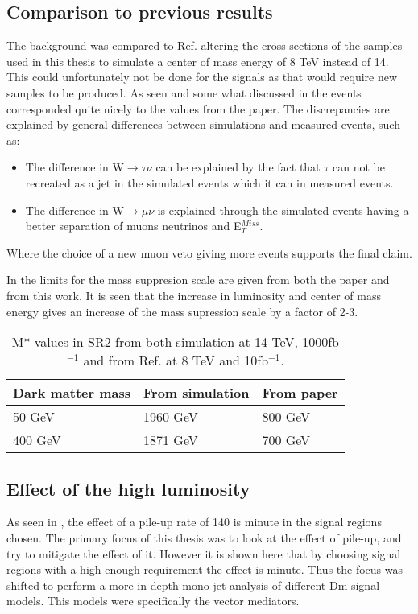 \subsection{Comparison to previous results}
The background was compared to Ref. \citep{ATLAS-CONF-2012-147} altering the cross-sections of the samples used in this thesis to simulate a center of mass energy of 8 TeV instead of 14. This could unfortunately not be done for the signals as that would require new samples to be produced. As seen and some what discussed in  the events corresponded quite nicely to the values from the paper. The discrepancies are explained by general differences between simulations and measured events, such as:
\begin{itemize}
\item The difference in W$\rightarrow\tau\nu$ can be explained by the fact that $\tau$ can not be recreated as a jet in the simulated events which it can in measured events.

\item The difference in W$\rightarrow\mu\nu$ is explained through the simulated events having a better separation of muons neutrinos and E$_T^{Miss}$.
\end{itemize}
Where the choice of a new muon veto giving more events supports the final claim.

In  the limits for the mass suppresion scale are given from both the paper and from this work. It is seen that the increase in luminosity and center of mass energy gives an increase of the mass supression scale by a factor of 2-3.

\begin{table}[ht]
\begin{center}
\begin{tabular}{|l|l|l|}
\hline
Dark matter mass & From simulation & From paper \\ \hline
50 GeV & 1960 GeV &800 GeV \\
400 GeV & 1871 GeV & 700 GeV \\ \hline
\end{tabular}
\caption{M* values in SR2 from both simulation at 14 TeV, 1000fb$^{-1}$ and from Ref. \citep{ATLAS-CONF-2012-147} at 8 TeV and 10fb$^{-1}$. }
\label{Comp pval}
\end{center}
\end{table}

\subsection{Effect of the high luminosity}\label{subsec:hleff}
As seen in , the effect of a pile-up rate of 140 is minute in the signal regions chosen. The primary focus of this thesis was to look at the effect of pile-up, and try to mitigate the effect of it. However it is shown here that by choosing signal regions with a high enough requirement the effect is minute. Thus the focus was shifted to perform a more in-depth mono-jet analysis of different Dm signal models. This models were specifically the vector mediators.

